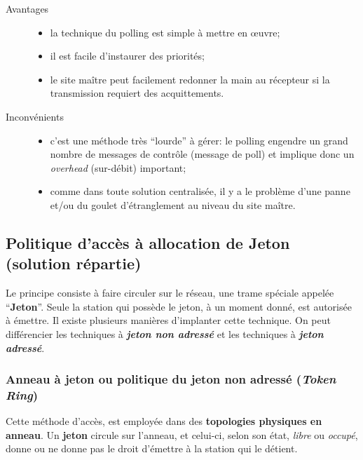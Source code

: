 \documentclass[11pt,english,french]{scrreprt}
\theoremstyle{remark}
\theoremstyle{definition}
\begin{document}
\begin{description}
	\item[Avantages] \hfill
	\begin{itemize}
			\item la technique du polling est simple à mettre en œuvre;
			\item il est facile d'instaurer des priorités;
			\item le site maître peut facilement redonner la main au récepteur si la transmission requiert des acquittements.
	\end{itemize}
	\item[Inconvénients] \hfill
	\begin{itemize}
		\item c'est une méthode très “lourde” à gérer: le polling engendre un grand nombre de messages de contrôle (message de poll) et implique donc un \emph{overhead} (sur-débit) important;
		\item comme dans toute solution centralisée, il y a le problème d'une panne et/ou du goulet d'étranglement au niveau du site maître.
	\end{itemize}
\end{description}

\subsection{Politique d'accès à allocation de Jeton (solution répartie)}

Le principe consiste à faire circuler sur le réseau, une trame spéciale appelée “\textbf{Jeton}”. Seule la station qui possède le jeton, à un moment donné, est autorisée à émettre. Il existe plusieurs manières d'implanter cette technique. On peut différencier les techniques à \emph{\textbf{jeton non adressé}} et les techniques à \emph{\textbf{jeton adressé}}.

\subsubsection*{Anneau à jeton ou politique du jeton non adressé (\emph{Token Ring})} %

Cette méthode d'accès, est employée dans des \textbf{topologies physiques en anneau}. Un \textbf{jeton} circule sur l'anneau, et celui-ci, selon son état, \emph{libre} ou \emph{occupé}, donne ou ne donne pas le droit d'émettre à la station qui le détient.
\end{document}
